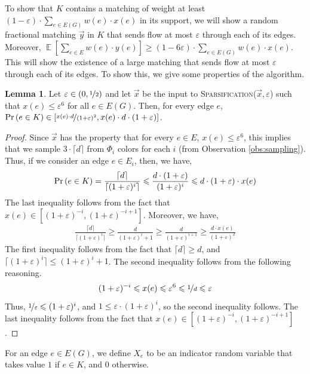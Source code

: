 \documentclass[a4paper,11pt]{article}
\DeclareMathOperator*{\Exp}{\ensuremath{{\mathbb{E}}}}
\DeclareMathOperator*{\Prob}{\ensuremath{\textnormal{Pr}}}
\renewcommand{\Pr}{\Prob}
\newcommand{\prob}[1]{\Pr\paren{#1}}
\newcommand{\paren}[1]{\left ( #1 \right )}
\newcommand{\bracket}[1]{\left [ #1 \right ]}
\newcommand{\expect}[1]{\Exp\bracket{#1}}
\newcommand{\eps}{\varepsilon}
\theoremstyle{definition}
\theoremstyle{definition}
\theoremstyle{definition}
\theoremstyle{definition}
\theoremstyle{definition}
\newtheorem{lemma2}[definition2]{Lemma}
\theoremstyle{definition}
\theoremstyle{definition}
\theoremstyle{definition}
\theoremstyle{definition}
\theoremstyle{definition}
\theoremstyle{definition}
\theoremstyle{definition}
\theoremstyle{definition}
\theoremstyle{definition}
\theoremstyle{definition}
\begin{document}
To show that $K$ contains a matching of weight at least $(1-\eps)\cdot \sum_{e\in E(G)}w(e)\cdot x(e)$ in its support, we will show a random fractional matching $\vec{y}$ in $K$ that sends flow at most $\eps$ through each of its edges. Moreover, $\expect{\sum_{e\in E}w(e)\cdot y(e)}\geqslant (1-6\eps)\cdot \sum_{e\in E(G)}w(e)\cdot x(e)$. This will show the existence of a large matching that sends flow at most $\eps$ through each of its edges. To show this, we give some properties of the algorithm.

\begin{lemma2}\label{lem:probbounds}
Let $\eps\in (0,\nicefrac{1}{2})$ and let $\vec{x}$ be the input to \textsc{Sparsification}($\vec{x},\eps$) such that $x(e)\leqslant \eps^6$ for all $e\in E(G)$. Then, for every edge $e$, $\prob{e\in K}\in \bracket{\nicefrac{x(e)\cdot d}{(1+\eps)^2},x(e)\cdot d\cdot (1+\eps)}$.
\end{lemma2}
\begin{proof}
Since $\vec{x}$ has the property that for every $e\in E$, $x(e)\leqslant \eps^6$, this implies that we sample $3\cdot \lceil d\rceil$ from $\Phi_i$ colors for each $i$ (from Observation \ref{obs:sampling}). Thus, if we consider an edge $e\in E_i$, then, we have,
\begin{align*}
\prob{e\in K}=\frac{\lceil d\rceil}{\lceil(1+\eps)^i\rceil}\leqslant \frac{d\cdot (1+\eps)}{(1+\eps)^i}\leqslant d\cdot (1+\eps)\cdot x(e)
\end{align*}
The last inequality follows from the fact that $x(e)\in \bracket{(1+\eps)^{-i},(1+\eps)^{-i+1}}$. Moreover, we have,
\begin{align*}
	\frac{\lceil d\rceil}{\lceil (1+\eps)^i\rceil}\geqslant \frac{d}{(1+\eps)^i+1}
	\geqslant \frac{d}{(1+\eps)^{i+1}}
	\geqslant \frac{d\cdot x(e)}{(1+\eps)^2}
	\end{align*}
The first inequality follows from the fact that $\lceil d\rceil \geqslant d$, and $\lceil (1+\eps)^i\rceil\leqslant (1+\eps)^i+1$. The second inequality follows from the following reasoning.
\begin{align*}
(1+\eps)^{-i}\leqslant x(e)\leqslant \eps^6\leqslant \nicefrac{1}{d}\leqslant \eps
\end{align*}
Thus, $\nicefrac{1}{\eps}\leqslant (1+\eps)^i$, and $1\leqslant \eps\cdot (1+\eps)^i$, so the second inequality follows. The last inequality follows from the fact that $x(e)\in \bracket{(1+\eps)^{-i},(1+\eps)^{-i+1}}$.
\end{proof}

For an edge $e\in E(G)$, we define $X_e$ to be an indicator random variable that takes value $1$ if $e\in K$, and $0$ otherwise. 
\end{document}
